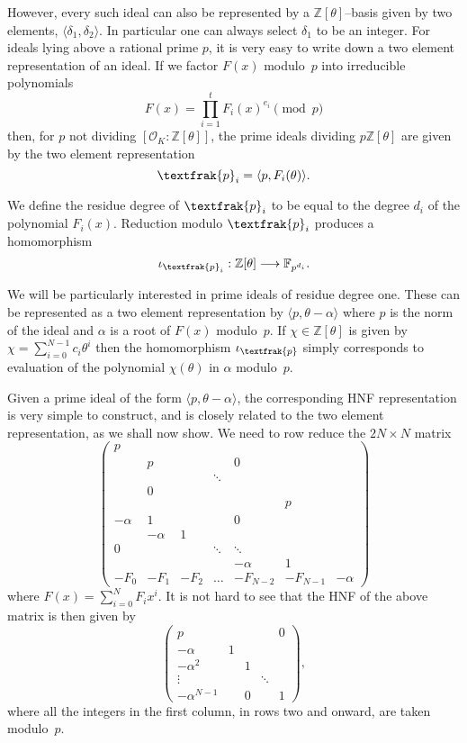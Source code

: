 \documentclass[a4paper, 12pt]{article}
\newcommand{\ndash}{\nobreakdash --}
\newcommand{\bb}[1]{\mathbb{#1}}
\newcommand{\mc}[1]{\mathcal{#1}}
\newcommand{\tfr}[1]{\textfrak{#1}}
\begin{document}
	However, every such ideal can also be represented by a $\bb{Z}[\theta]$\ndash basis given by two elements, $\langle \delta_1, \delta_2 \rangle$.
	In particular one can always select $\delta_1$ to be an integer.
	For ideals lying above a rational prime $p$, it is very easy to write down a two element representation of an ideal.
	If we factor $F(x)$ modulo~$p$ into irreducible	polynomials
	\[
		F(x) = {\prod_{i=1}^{t}{F_i(x)^{e_i}}}\pmod{p}
	\]
	then, for $p$ not dividing $[\mc{O}_K: \bb{Z}[\theta]]$, the prime ideals dividing $p\bb{Z}[\theta]$ are given by the two element representation
	\[
		\tfr{p}_i = \langle p,F_i(\theta) \rangle.
	\]
	
	We define the residue degree of $\tfr{p}_i$ to be equal to the degree $d_i$ of the polynomial $F_i(x)$.
	Reduction modulo $\tfr{p}_i$ produces a homomorphism
	\[
		\iota_{\tfr{p}_i} : \bb{Z}[\theta] \longrightarrow \bb{F}_{p^{d_i}}.
	\]
	
	We will be particularly interested in prime ideals of residue degree one. 
	These can be represented as a two element representation by $\langle p, \theta - \alpha \rangle$ where $p$ is the norm of the ideal and $\alpha$ is a root of $F(x)$ modulo~$p$.
	If $\chi \in \bb{Z}[\theta]$ is given by $\chi = \sum_{i=0}^{N-1}{c_i \theta^i}$ then the homomorphism $\iota_\tfr{p}$ simply corresponds to evaluation of the polynomial $\chi(\theta)$ in $\alpha$ modulo~$p$.
	
	Given a prime ideal of the form $\langle p, \theta - \alpha \rangle$, the corresponding HNF representation is very simple to construct, and is closely related to the two element	representation, as we shall now show. 
	We need to row reduce the $2N \times N$ matrix
	\[
		\begin{pmatrix}
			p & & & & & &\\
			& p & & & 0 & &\\
			& & & \ddots & & &\\
			& 0 & & & & &\\
			& & & & & p &\\
			-\alpha & 1 & & & 0 & &\\
			& -\alpha & 1 & & & &\\
			0 & & & \ddots & \ddots & &\\
			& & & & -\alpha & 1 &\\
			-F_0 & -F_1 & -F_2 & \ldots & -F_{N-2} & -F_{N-1} & -\alpha
		\end{pmatrix}
	\]
	where $F(x) = \sum_{i=0}^{N}F_i x^i$. It is not hard to see that the HNF of the above matrix is then given by
	\[
		\begin{pmatrix}
			p & & & & 0\\
			-\alpha& 1 & & &\\
			-\alpha^2 & & 1 & &\\
			\vdots & & & \ddots &\\
			-\alpha^{N-1} & & 0 & & 1
		\end{pmatrix},
	\]
	where all the integers in the first column, in rows two and onward, are taken modulo~$p$.
	
\end{document}
